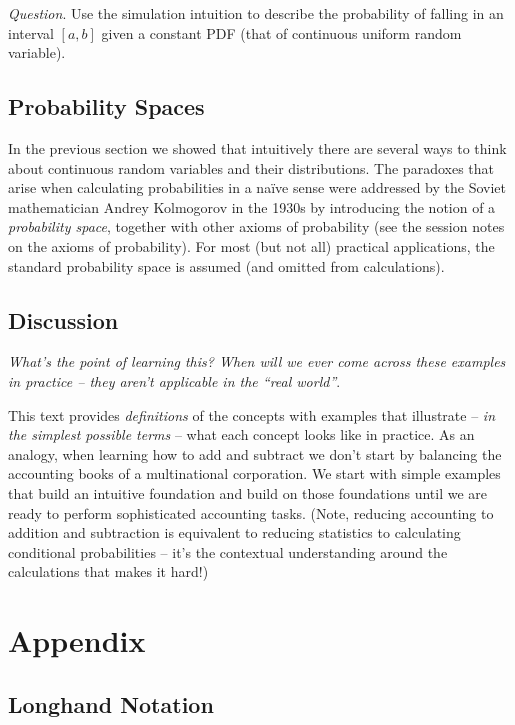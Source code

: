 \emph{Question}. 
Use the simulation intuition to describe the 
probability of falling in an interval \([a, b]\) given a
constant PDF (that of continuous uniform random variable).

\subsection{Probability Spaces}

In the previous section we showed that 
intuitively there are several ways to think about 
continuous random variables and their distributions.
The paradoxes that arise when calculating probabilities in a naïve sense
were addressed by the Soviet mathematician Andrey Kolmogorov in the
1930s by introducing the notion of a \emph{probability space}, 
together with other axioms of probability 
(see the session notes on the axioms of probability). 
For most (but not all) practical applications, 
the standard probability space is assumed (and omitted from calculations).

\subsection{Discussion}
\emph{What's the point of learning this? When will we ever come across
these examples in practice -- they aren't applicable in the ``real world''}.

This text provides \emph{definitions} of the concepts with examples that
illustrate -- \emph{in the simplest possible terms} -- what each concept looks like in practice. 
As an analogy, 
when learning how to add and subtract we don't start by 
balancing the accounting books of a multinational corporation. 
We start with simple examples that build an intuitive foundation and build on those 
foundations until we are ready to perform sophisticated accounting tasks. 
(Note, reducing accounting to addition and subtraction is equivalent to reducing 
statistics to calculating conditional probabilities 
-- it's the contextual understanding around the calculations that makes it hard!)

\section{Appendix}

\subsection{Longhand Notation}

